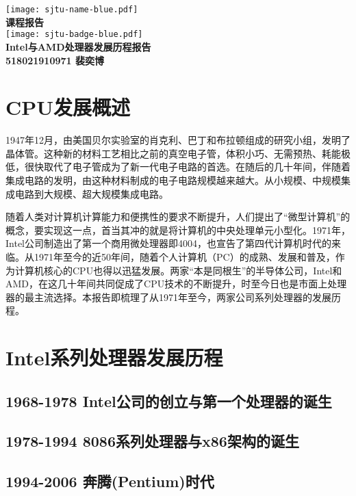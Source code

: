 \documentclass[UTF8]{ctexart}
\begin{document}
\begin{titlepage}
    \begin{center}
        \texttt{[image: sjtu-name-blue.pdf]}\\[1cm]
        \textsc{\Huge \bfseries 课程报告}\\[1.5cm]
        \texttt{[image: sjtu-badge-blue.pdf]}\\[0.5cm]

        \Huge \bfseries{Intel与AMD处理器发展历程报告}\\[1cm]
        \Large \bfseries{518021910971 裴奕博}
    \end{center}
\end{titlepage}
\section{CPU发展概述}
1947年12月，由美国贝尔实验室的肖克利、巴丁和布拉顿组成的研究小组，发明了晶体管。这种新的材料工艺相比之前的真空电子管，体积小巧、无需预热、耗能极低，很快取代了电子管成为了新一代电子电路的首选。在随后的几十年间，伴随着集成电路的发明，由这种材料制成的电子电路规模越来越大。从小规模、中规模集成电路到大规模、超大规模集成电路。

随着人类对计算机计算能力和便携性的要求不断提升，人们提出了“微型计算机”的概念，要实现这一点，首当其冲的就是将计算机的中央处理单元小型化。1971年，Intel公司制造出了第一个商用微处理器即4004，也宣告了第四代计算机时代的来临。从1971年至今的近50年间，随着个人计算机（PC）的成熟、发展和普及，作为计算机核心的CPU也得以迅猛发展。两家“本是同根生”的半导体公司，Intel和AMD，在这几十年间共同促成了CPU技术的不断提升，时至今日也是市面上处理器的最主流选择。本报告即梳理了从1971年至今，两家公司系列处理器的发展历程。
\section{Intel系列处理器发展历程}
\subsection{1968-1978 Intel公司的创立与第一个处理器的诞生}
\subsection{1978-1994 8086系列处理器与x86架构的诞生}
\subsection{1994-2006 奔腾(Pentium)时代}
\end{document}
